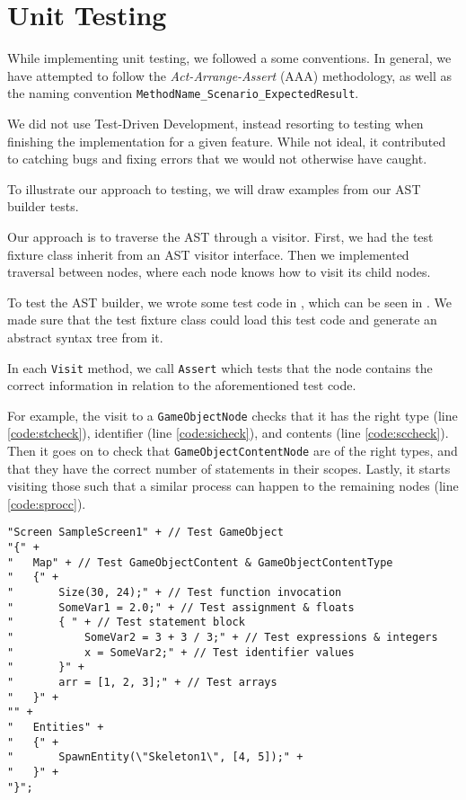 \section{Unit Testing}
While implementing unit testing, we followed a some conventions.
In general, we have attempted to follow the \textit{Act-Arrange-Assert} (AAA)
methodology, as well as the naming convention 
\texttt{MethodName\_Scenario\_ExpectedResult}.

We did not use Test-Driven Development, instead resorting to testing
when finishing the implementation for a given feature. While not ideal, it
contributed to catching bugs and fixing errors that we would not
otherwise have caught.

To illustrate our approach to testing, we will draw examples from our
AST builder tests.

Our approach is to traverse the AST through a visitor. First,
we had the test fixture class inherit from an AST visitor interface.
Then we implemented traversal between nodes, where each node knows how
to visit its child nodes.

To test the AST builder, we wrote some test code in \dazel{}, which can be seen in . We made sure that
the test fixture class could load this test code and generate an abstract syntax tree from it.

In each \texttt{Visit} method, we call \texttt{Assert} which tests
that the node contains the correct information in relation to the
aforementioned \dazel{} test code.

For example, the visit to a \texttt{GameObjectNode} checks that it has the
right type (line \ref{code:stcheck}), identifier (line \ref{code:sicheck}), and contents (line \ref{code:sccheck}). Then it goes on to check that
\texttt{GameObjectContentNode} are of the right types, and that they have
the correct number of statements in their scopes. Lastly, it starts visiting
those such that a similar process can happen to the remaining nodes (line \ref{code:sprocc}).

\begin{lstlisting}[language=CSharp, caption={AST Builder \dazel{} test code.}, label={lst:asttestcode}]
"Screen SampleScreen1" + // Test GameObject
"{" +
"   Map" + // Test GameObjectContent & GameObjectContentType
"   {" +
"       Size(30, 24);" + // Test function invocation
"       SomeVar1 = 2.0;" + // Test assignment & floats
"       { " + // Test statement block
"           SomeVar2 = 3 + 3 / 3;" + // Test expressions & integers
"           x = SomeVar2;" + // Test identifier values
"       }" +
"       arr = [1, 2, 3];" + // Test arrays
"   }" +
"" +
"   Entities" +
"   {" +
"       SpawnEntity(\"Skeleton1\", [4, 5]);" +
"   }" +
"}";
\end{lstlisting}


